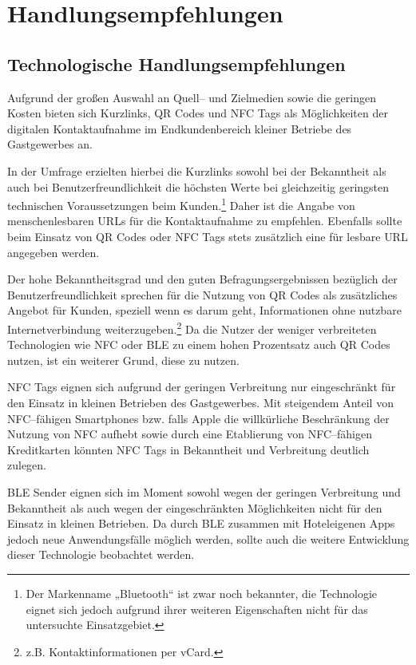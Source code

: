 

\newpage
\section{Handlungsempfehlungen} %
\label{sec:handlungsempfehlungen}

\subsection{Technologische Handlungsempfehlungen} %
\label{sub:technologische_handlungsempfehlungen}
Aufgrund der großen Auswahl an Quell– und Zielmedien sowie die geringen Kosten bieten sich Kurzlinks, QR Codes und NFC Tags als Möglichkeiten der digitalen Kontaktaufnahme im Endkundenbereich kleiner Betriebe des Gastgewerbes an. 

In der Umfrage erzielten hierbei die Kurzlinks sowohl bei der Bekanntheit als auch bei Benutzerfreundlichkeit die höchsten Werte bei gleichzeitig geringsten technischen Voraussetzungen beim Kunden.\footnote{Der Markenname „Bluetooth“ ist zwar noch bekannter, die Technologie eignet sich jedoch aufgrund ihrer weiteren Eigenschaften nicht für das untersuchte Einsatzgebiet.} Daher ist die Angabe von menschenlesbaren \ac{URL}s für die Kontaktaufnahme zu empfehlen. Ebenfalls sollte beim Einsatz von QR Codes oder NFC Tags stets zusätzlich eine für lesbare \ac{URL} angegeben werden.

Der hohe Bekanntheitsgrad und den guten Befragungsergebnissen bezüglich der Benutzerfreundlichkeit sprechen für die Nutzung von QR Codes als zusätzliches Angebot für Kunden, speziell wenn es darum geht, Informationen ohne nutzbare Internetverbindung weiterzugeben.\footnote{z.B. Kontaktinformationen per vCard.} Da die Nutzer der weniger verbreiteten Technologien wie NFC oder BLE zu einem hohen Prozentsatz auch QR Codes nutzen, ist ein weiterer Grund, diese zu nutzen.

NFC Tags eignen sich aufgrund der geringen Verbreitung nur eingeschränkt für den Einsatz in kleinen Betrieben des Gastgewerbes. Mit steigendem Anteil von NFC–fähigen Smartphones bzw. falls Apple die willkürliche Beschränkung der Nutzung von NFC aufhebt sowie durch eine Etablierung von NFC–fähigen Kreditkarten könnten NFC Tags in Bekanntheit und Verbreitung deutlich zulegen. 

BLE Sender eignen sich im Moment sowohl wegen der geringen Verbreitung und Bekanntheit als auch wegen der eingeschränkten Möglichkeiten nicht für den Einsatz in kleinen Betrieben. Da durch BLE zusammen mit Hoteleigenen Apps jedoch neue Anwendungsfälle möglich werden, sollte auch die weitere Entwicklung dieser Technologie beobachtet werden.


